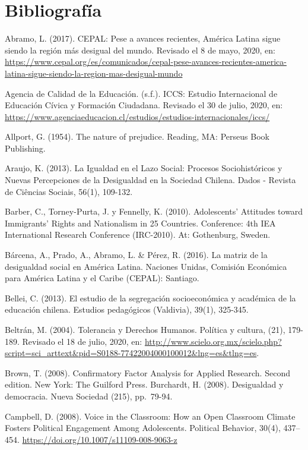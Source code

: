 \documentclass[12pt,twoside]{templates/facsothesis}
\begin{document}
\hypertarget{bibliografuxeda}{%
\chapter*{Bibliografía}\label{bibliografuxeda}}

Abramo, L. (2017). CEPAL: Pese a avances recientes, América Latina sigue siendo la región más desigual del mundo. Revisado el 8 de mayo, 2020, en: \url{https://www.cepal.org/es/comunicados/cepal-pese-avances-recientes-america-latina-sigue-siendo-la-region-mas-desigual-mundo}

Agencia de Calidad de la Educación. (s.f.). ICCS: Estudio Internacional de Educación Cívica y Formación Ciudadana. Revisado el 30 de julio, 2020, en: \url{https://www.agenciaeducacion.cl/estudios/estudios-internacionales/iccs/}

Allport, G. (1954). The nature of prejudice. Reading, MA: Perseus Book Publishing.

Araujo, K. (2013). La Igualdad en el Lazo Social: Procesos Sociohistóricos y Nuevas Percepciones de la Desigualdad en la Sociedad Chilena. Dados - Revista de Ciências Sociais, 56(1), 109-132.

Barber, C., Torney-Purta, J. y Fennelly, K. (2010). Adolescents' Attitudes toward Immigrants' Rights and Nationalism in 25 Countries. Conference: 4th IEA International Research Conference (IRC-2010). At: Gothenburg, Sweden.

Bárcena, A., Prado, A., Abramo, L. \& Pérez, R. (2016). La matriz de la desigualdad social en América Latina. Naciones Unidas, Comisión Económica para América Latina y el Caribe (CEPAL): Santiago.

Bellei, C. (2013). El estudio de la segregación socioeconómica y académica de la educación chilena. Estudios pedagógicos (Valdivia), 39(1), 325-345.

Beltrán, M. (2004). Tolerancia y Derechos Humanos. Política y cultura, (21), 179-189. Revisado el 18 de julio, 2020, en: \url{http://www.scielo.org.mx/scielo.php?script=sci_arttext\&pid=S0188-77422004000100012\&lng=es\&tlng=es}.

Brown, T. (2008). Confirmatory Factor Analysis for Applied Research. Second edition. New York: The Guilford Press.
Burchardt, H. (2008). Desigualdad y democracia. Nueva Sociedad (215), pp.~79-94.

Campbell, D. (2008). Voice in the Classroom: How an Open Classroom Climate Fosters Political Engagement Among Adolescents. Political Behavior, 30(4), 437--454. \url{https://doi.org/10.1007/s11109-008-9063-z}
\end{document}
